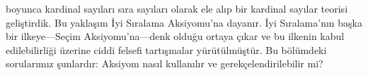 



 boyunca
kardinal sayıları sıra sayıları olarak ele alıp bir kardinal sayılar teorisi
geliştirdik. Bu yaklaşım İyi Sıralama Aksiyomu'na dayanır. İyi Sıralama'nın
başka bir ilkeye---Seçim Aksiyomu'na---denk olduğu ortaya çıkar ve bu
ilkenin kabul edilebilirliği üzerine ciddi felsefi tartışmalar yürütülmüştür.
Bu bölümdeki sorularımız şunlardır: Aksiyom nasıl kullanılır ve
gerekçelendirilebilir mi?

